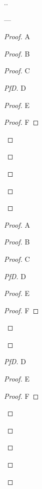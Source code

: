 \documentclass{article}
\begin{document}
    ..

    \FooT

    \FooA

    \BearT

    \BearA


    ---

    \begin{proof}
        A
        \begin{proof}
            B
            \begin{proof}
                C
                \begin{proof}[PfD]
                    D
                    \begin{proof}
                        E
                        \begin{proof}
                            F
                        \end{proof}
                    \end{proof}
                \end{proof}
            \end{proof}
        \end{proof}
    \end{proof}
    \begin{proof}
        A
        \begin{proof}
            B
            \begin{proof}
                C
                \begin{proof}[PfD]
                    D
                    \begin{proof}
                        E
                        \begin{proof}
                            F
                        \end{proof}
                    \end{proof}
                \end{proof}
                \begin{proof}[PfD]
                    D
                    \begin{proof}
                        E
                        \begin{proof}
                            F
                        \end{proof}
                    \end{proof}
                \end{proof}
            \end{proof}
        \end{proof}
    \end{proof}
\end{document}
